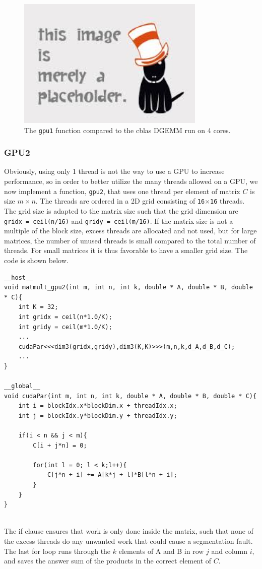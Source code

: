\begin{figure}
\centering
\includegraphics[width = 0.8\textwidth]{fig/placeholder.jpg}
\caption{The \texttt{gpu1} function compared to the cblas DGEMM run on 4 cores.}
\label{fig:gpu1_DGEMM}
\end{figure}

\subsubsection{GPU2}
Obviously, using only 1 thread is not the way to use a GPU to increase performance, so in order to better utilize the many threads allowed on a GPU, we now implement a function, \texttt{gpu2}, that uses one thread per element of matrix $C$ is size $m\times n$. The threads are ordered in a 2D grid consisting of \texttt{16$\times$16} threads. The grid size is adapted to the matrix size such that the grid dimension are \texttt{gridx = ceil(n/16)} and \texttt{gridy = ceil(m/16)}. If the matrix size is not a multiple of the block size, excess threads are allocated and not used, but for large matrices, the number of unused threads is small compared to the total number of threads. For small matrices it is thus favorable to have a smaller grid size. The code is shown below.
\begin{lstlisting}[caption = Code sample of the naive implementation with one thread per element in $C$.]
__host__
void matmult_gpu2(int m, int n, int k, double * A, double * B, double * C){	
	int K = 32;
	int gridx = ceil(n*1.0/K);
	int gridy = ceil(m*1.0/K);
	...
	cudaPar<<<dim3(gridx,gridy),dim3(K,K)>>>(m,n,k,d_A,d_B,d_C);
	...
}

__global__
void cudaPar(int m, int n, int k, double * A, double * B, double * C){
	int i = blockIdx.x*blockDim.x + threadIdx.x;
	int j = blockIdx.y*blockDim.y + threadIdx.y;

	if(i < n && j < m){
		C[i + j*n] = 0;

		for(int l = 0; l < k;l++){
			C[j*n + i] += A[k*j + l]*B[l*n + i];
		}
	}
}
	
\end{lstlisting}
The if clause ensures that work is only done inside the matrix, such that none of the excess threads do any unwanted work that could cause a segmentation fault. The last for loop runs through the $k$ elements of A and B in row $j$ and column $i$, and saves the answer sum of the products in the correct element of $C$.

